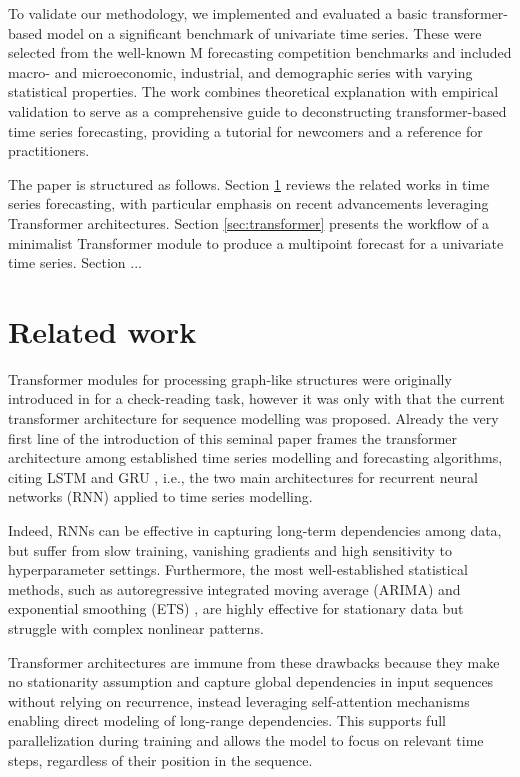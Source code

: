 \documentclass[algorithms,article,submit,pdftex,moreauthors]{Definitions/mdpi}
\begin{document}
To validate our methodology, we implemented and evaluated a basic transformer-based model on a significant benchmark of univariate time series. These were selected from the well-known M forecasting competition benchmarks and included macro- and microeconomic, industrial, and demographic series with varying statistical properties. The work combines theoretical explanation with empirical validation to serve as a comprehensive guide to deconstructing transformer-based time series forecasting, providing a tutorial for newcomers and a reference for practitioners.

The paper is structured as follows. Section \ref{sec:literature} reviews the related works in time series forecasting, with particular emphasis on recent advancements leveraging Transformer architectures. Section \ref{sec:transformer} presents the workflow of a minimalist Transformer module to produce a multipoint forecast for a univariate time series. Section ...

\section{Related work} \label{sec:literature}

Transformer modules for processing graph-like structures were originally introduced in \citep{LBB97} for a check-reading task, however it was only with \citep{VSPU17} that the current transformer architecture for sequence modelling was proposed. Already the very first line of the introduction of this seminal paper frames the transformer architecture among established time series modelling and forecasting algorithms, citing LSTM \citep{HS97} and GRU \citep{ CGCB14}, i.e., the two main architectures for recurrent neural networks (RNN) applied to time series modelling.

Indeed, RNNs can be effective in capturing long-term dependencies among data, but suffer from slow training, vanishing gradients and high sensitivity to hyperparameter settings. Furthermore, the most well-established statistical methods, such as autoregressive integrated moving average (ARIMA) \citep{BJ70} and exponential smoothing (ETS) \citep{H57,W60}, are highly effective for stationary data but struggle with complex nonlinear patterns.

Transformer architectures are immune from these drawbacks because they make no stationarity assumption and capture global dependencies in input sequences without relying on recurrence, instead leveraging self-attention mechanisms enabling direct modeling of long-range dependencies. This supports full parallelization during training and allows the model to focus on relevant time steps, regardless of their position in the sequence.
\end{document}
